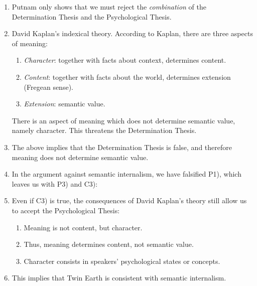 \begin{objection}[Indexicals]\leavevmode
\begin{enumerate}[label=\roman*.]
  \item Putnam only shows that we must reject the \emph{combination} of the Determination Thesis and the Psychological Thesis.
  \item David Kaplan's indexical theory. According to Kaplan, there are three aspects of meaning:
  \begin{enumerate}[label=(\alph*)]
    \item \emph{Character}: together with facts about context, determines content.
    \item \emph{Content}: together with facts about the world, determines extension (Fregean sense).
    \item \emph{Extension}: semantic value.
  \end{enumerate}
  There is an aspect of meaning which does not determine semantic value, namely character. This threatens the Determination Thesis.
  \item The above implies that the Determination Thesis is false, and therefore meaning does not determine semantic value.
  \item In the argument against semantic internalism, we have falsified P1), which leaves us with P3) and C3):
  \item Even if C3) is true, the consequences of David Kaplan's theory still allow us to accept the Psychological Thesis:
  \begin{enumerate}
    \item Meaning is not content, but character.
    \item Thus, meaning determines content, not semantic value.
    \item Character consists in speakers' psychological states or concepts.
  \end{enumerate}
  \item This implies that Twin Earth is consistent with semantic internalism.
\end{enumerate}
\end{objection}

